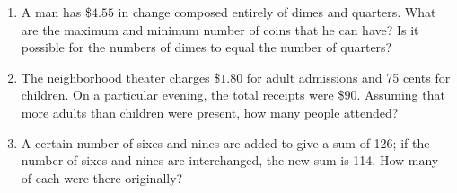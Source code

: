\begin{exercise}
    \begin{enumerate}
        \item A man has \$$4.55$ in change composed entirely of dimes and quarters. What are the maximum and minimum number of coins that he can have? Is it possible for the numbers of dimes to equal the number of quarters?
        \item The neighborhood theater charges \$$1.80$ for adult admissions and 75 cents for children. On a particular evening, the total receipts were \$90. Assuming that more adults than children were present, how many people attended?
        \item A certain number of sixes and nines are added to give a sum of 126; if the number of sixes and nines are interchanged, the new sum is 114. How many of each were there originally?
    \end{enumerate}
\end{exercise}

